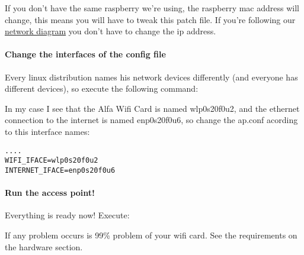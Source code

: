 If you don't have the same raspberry we're using, the raspberry mac
address will change, this means you will have to tweak this patch file.
If you're following our \href{}{network diagram} you don't have to
change the ip address.

\paragraph{Change the interfaces of the config
file}\label{change-the-interfaces-of-the-config-file}

Every linux distribution names his network devices differently (and
everyone has different devices), so execute the following command:

\begin{Shaded}
\begin{Highlighting}[]
\ExtensionTok{$}
\OperatorTok{\textless{}}\OperatorTok{\textgreater{}}
\OperatorTok{\textless{}}\OperatorTok{\textgreater{}}
\end{Highlighting}
\end{Shaded}

In my case I see that the Alfa Wifi Card is named wlp0s20f0u2, and the
ethernet connection to the internet is named enp0s20f0u6, so change the
ap.conf acording to this interface names:

\begin{verbatim}
....
WIFI_IFACE=wlp0s20f0u2
INTERNET_IFACE=enp0s20f0u6
\end{verbatim}

\paragraph{Run the access point!}\label{run-the-access-point}

Everything is ready now! Execute:

\begin{Shaded}
\begin{Highlighting}[]
\ExtensionTok{$}
\end{Highlighting}
\end{Shaded}

If any problem occurs is 99\% problem of your wifi card. See the
requirements on the hardware section.
